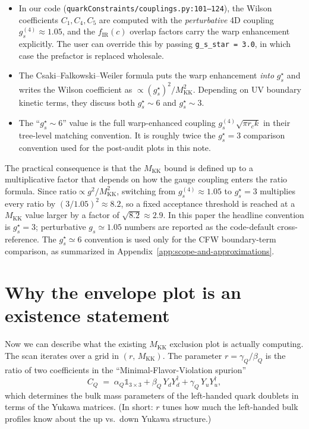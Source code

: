 \documentclass[11pt]{article}
\newcommand{\Mkk}{M_{\mathrm{KK}}}
\newcommand{\gs}{g_s^{\star}}
\newcommand{\gsfour}{g_s^{(4)}}
\newcommand{\Yu}{Y_u}
\newcommand{\Yd}{Y_d}
\begin{document}
\begin{itemize}[leftmargin=2em,itemsep=2pt]
  \item In our code (\texttt{quarkConstraints/couplings.py:101--124}), the
        Wilson coefficients $C_1, C_4, C_5$ are computed with the
        \emph{perturbative} 4D coupling $\gsfour\!\approx\!1.05$, and the
        $f_{\mathrm{IR}}(c)$ overlap factors carry the warp enhancement
        explicitly. The user can override this by passing
        \texttt{g\_s\_star = 3.0}, in which case the prefactor is
        replaced wholesale.
  \item The Csaki--Falkowski--Weiler formula puts the warp enhancement
        \emph{into} $\gs$ and writes the Wilson coefficient as
        $\propto (\gs)^2/\Mkk^2$.  Depending on UV boundary kinetic terms,
        they discuss both $\gs\!\sim\!6$ and $\gs\!\sim\!3$.
  \item The ``$\gs\!\sim\!6$'' value is the full warp-enhanced coupling
        $\gsfour\sqrt{\pi r_c k}$ in their tree-level matching convention.
        It is roughly twice the $\gs = 3$ comparison convention used for
        the post-audit plots in this note.
\end{itemize}

The practical consequence is that the $\Mkk$ bound is defined up to a
multiplicative factor that depends on how the gauge coupling enters the
ratio formula. Since $\mathrm{ratio}\propto g^2/\Mkk^2$, switching from
$\gsfour\!\approx\!1.05$ to $\gs = 3$ multiplies every ratio by
$(3/1.05)^2 \approx 8.2$, so a fixed acceptance threshold is reached at
a $\Mkk$ value larger by a factor of $\sqrt{8.2}\approx 2.9$. In this
paper the headline convention is $\gs=3$; perturbative $g_s\simeq1.05$
numbers are reported as the code-default cross-reference.  The
$\gs\simeq6$ convention is used only for the CFW boundary-term comparison,
as summarized in Appendix~\ref{app:scope-and-approximations}.

\section{Why the envelope plot is an existence statement}
\label{sec:envelope-existence}

Now we can describe what the existing $\Mkk$ exclusion plot is actually
computing. The scan iterates over a grid in $(r,\,\Mkk)$. The parameter
$r = \gamma_Q/\beta_Q$ is the ratio of two coefficients in the
``Minimal-Flavor-Violation spurion''
\begin{equation}
  C_Q \;=\; \alpha_Q \mathbb{1}_{3\times3}
          + \beta_Q\,\Yd\Yd^\dagger
          + \gamma_Q\,\Yu\Yu^\dagger,
  \label{eq:cq-spurion}
\end{equation}
which determines the bulk mass parameters of the left-handed quark doublets
in terms of the Yukawa matrices. (In short: $r$ tunes how much the
left-handed bulk profiles know about the up vs.\ down Yukawa structure.)
\end{document}
